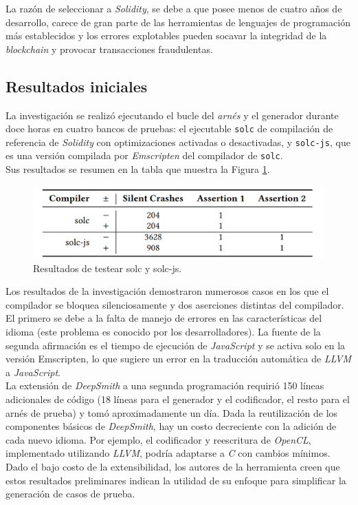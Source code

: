 La razón de seleccionar a \textit{Solidity}, se debe a que posee me\textit{}nos de cuatro años de desarrollo, carece de gran parte de las herramientas de lenguajes de programación más establecidos y los errores explotables pueden socavar la integridad de la \textit{blockchain} y provocar transacciones fraudulentas. 

\subsection{Resultados iniciales}
La investigación se realizó ejecutando el bucle del \textit{arnés} y el generador durante doce horas en cuatro bancos de pruebas: el ejecutable \texttt{solc} de compilación de referencia de \textit{Solidity} con optimizaciones activadas o desactivadas, y \texttt{solc-js}, que es una versión compilada por \textit{Emscripten} del compilador de \texttt{solc}.\\

Sus resultados se resumen en la tabla que muestra la Figura \ref{fig:deepsmith solc}.

\begin{figure}[ht]
    \centering
    \includegraphics[scale=0.3]{images/deepsmithsolc.png}
    \caption{Resultados de testear solc y solc-js.}
    \label{fig:deepsmith solc}
\end{figure}


Los resultados de la investigación demostraron numerosos casos en los que el compilador se bloquea silenciosamente y dos aserciones distintas del compilador. El primero se debe a la falta de manejo de errores en las características del idioma (este problema es conocido por los desarrolladores). La fuente de la segunda afirmación es el tiempo de ejecución de \textit{JavaScript} y se activa solo en la versión Emscripten, lo que sugiere un error en la traducción automática de \textit{LLVM} a \textit{JavaScript}.\\

La extensión de \textit{DeepSmith} a una segunda programación requirió 150 líneas adicionales de código (18 líneas para el generador y el codificador, el resto para el arnés de prueba) y tomó aproximadamente un día. Dada la reutilización de los componentes básicos de \textit{DeepSmith}, hay un costo decreciente con la adición de cada nuevo idioma. Por ejemplo, el codificador y reescritura de \textit{OpenCL}, implementado utilizando \textit{LLVM}, podría adaptarse a \textit{C} con cambios mínimos. Dado el bajo costo de la extensibilidad, los autores de la herramienta creen que estos resultados preliminares indican la utilidad de su enfoque para simplificar la generación de casos de prueba.

